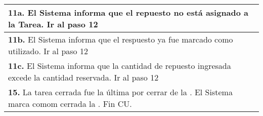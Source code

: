 \documentclass[12pt]{extarticle}
\begin{document}
\begin{longtable}{ |p{8cm}|p{8cm}| }
		\hline	
		\multicolumn{2}{|p{16cm}|}{\textbf{11a. }El Sistema informa que el repuesto no está asignado a la Tarea. Ir al paso 12}\\
		\hline	
		\multicolumn{2}{|p{16cm}|}{\textbf{11b. }El Sistema informa que el respuesto ya fue marcado como utilizado. Ir al paso 12}\\
		\hline	
        \multicolumn{2}{|p{16cm}|}{\textbf{11c. }El Sistema informa que la cantidad de repuesto ingresada excede la cantidad reservada. Ir al paso 12}\\
		\hline	
        \multicolumn{2}{|p{16cm}|}{\textbf{15. }La tarea cerrada fue la última por cerrar de la \OT{}. El Sistema marca comom cerrada la \OT{}. Fin CU.}\\
		\hline	
	\end{longtable}

    \resetinc{}
    \raya{}
\end{document}

